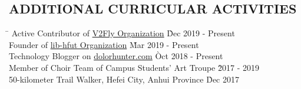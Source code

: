 \documentclass{res}
\begin{document}
\begin{resume}
\section{ADDITIONAL CURRICULAR ACTIVITIES}
    \vspace{-0.1in}	
    \begin{tabbing}
    \hspace{5in}\= \kill %
    Active Contributor of \href{https://github.com/v2fly}{V2Fly Organization} \` Dec 2019 - Present \\ 
    Founder of \href{https://github.com/lib-hfut}{lib-hfut Organization} \` Mar 2019 - Present \\  
    Technology Blogger on \href{https://dolorhunter.com}{dolorhunter.com} \` Oct 2018 - Present \\
    Member of Choir Team of Campus Students' Art Troupe \` 2017 - 2019 \\
    50-kilometer Trail Walker, Hefei City, Anhui Province \` Dec 2017  
    \end{tabbing}\vspace{-20pt}      %

\end{resume}
\end{document}
